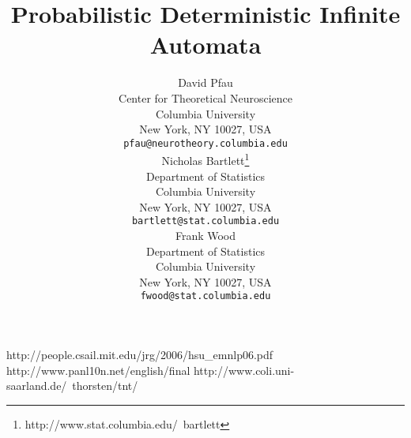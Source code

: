 \documentclass{article}
\title{Probabilistic Deterministic Infinite Automata}
\author{
David Pfau \\
Center for Theoretical Neuroscience \\
Columbia University\\
New York, NY 10027, USA \\
\texttt{pfau@neurotheory.columbia.edu} \\
\AND
Nicholas Bartlett\thanks{ http://www.stat.columbia.edu/~bartlett} \\
Department of Statistics\\
Columbia University\\
New York, NY 10027, USA \\
\texttt{bartlett@stat.columbia.edu} \\
\And
Frank Wood \\
Department of Statistics\\
Columbia University\\
New York, NY 10027, USA \\
\texttt{fwood@stat.columbia.edu} \\
}
\begin{document}
\maketitle








%



%





http://people.csail.mit.edu/jrg/2006/hsu\_emnlp06.pdf
http://www.panl10n.net/english/final%
http://www.coli.uni-saarland.de/~thorsten/tnt/


\begin{small}

 
%
\end{small}
\end{document}
